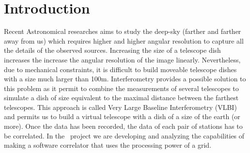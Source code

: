 \section{Introduction}

Recent Astronomical researches aims to study the deep-sky (farther and
farther away from us) which requires higher and higher angular
resolution to capture all the details of the observed sources.
Increasing the size of a telescope dish increases the increase the
angular resolution of the image linearly.  Nevertheless, due to
mechanical constraints, it is difficult to build moveable telescope
dishes with a size much larger than 100m. Interferometry provides a
possible solution to this problem as it permit to combine the
measurements of several telescopes to simulate a dish of size
equivalent to the maximal distance between the farthest telescopes.
This approach is called Very Large Baseline Interferometry (VLBI) and
permits us to build a virtual telescope with a dish of a size of the
earth (or more). Once the data has been recorded, the data of each
pair of stations has to be correlated.  In the \scarie\ project we are
developing and analyzing the capabilities of making a software
correlator that uses the processing power of a grid.

